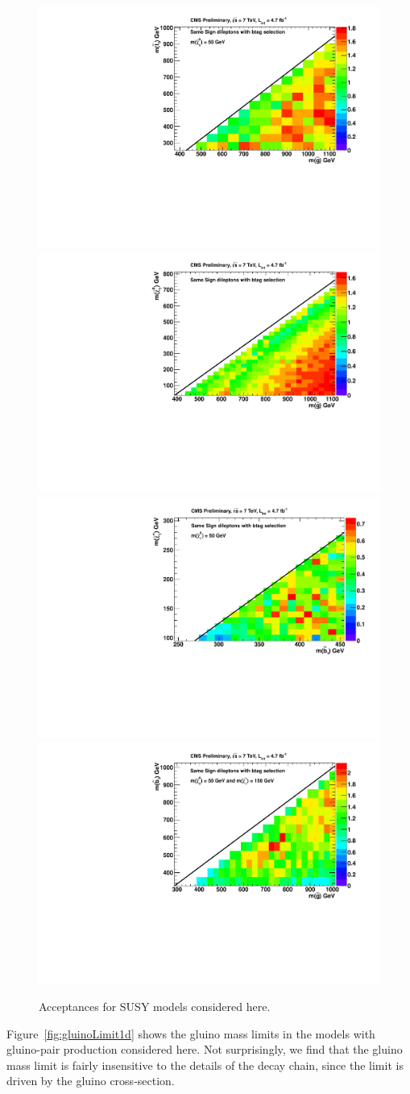 \begin{figure}[htb]
\begin{center}
\includegraphics[width=0.49\linewidth]{figs/GlStop_50_AcceptanceCarpet.pdf}
\includegraphics[width=0.49\linewidth]{figs/T1tttt_AcceptanceCarpet.pdf}
\includegraphics[width=0.49\linewidth]{figs/B1_AcceptanceCarpet.pdf}
\includegraphics[width=0.49\linewidth]{figs/B2_AcceptanceCarpet_150.pdf}
\caption{Acceptances for SUSY models considered here.
\label{fig:acceptance-maps}}
\end{center}
\end{figure}


Figure~\ref{fig:gluinoLimit1d} shows the gluino mass limits
in the models with gluino-pair production considered here.
Not surprisingly,
we find that the gluino mass limit is fairly insensitive 
to the details of the decay chain, since the limit
is driven by the gluino cross-section.

